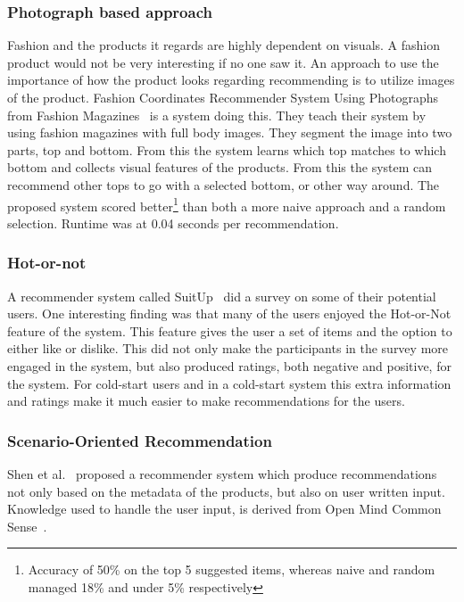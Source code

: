 \subsubsection{Photograph based approach}
    Fashion and the products it regards are highly dependent on visuals.  A fashion
    product would not be very interesting if no one saw it.  An approach to use the
    importance of how the product looks regarding recommending is to utilize images
    of the product.  Fashion Coordinates Recommender System Using Photographs from
    Fashion Magazines~\cite{Iwata:2011} is a system doing this.  They teach their
    system by using fashion magazines with full body images.  They segment the
    image into two parts, top and bottom.  From this the system learns which top
    matches to which bottom and collects visual features of the products.  From
    this the system can recommend other tops to go with a selected bottom, or other
    way around.  The proposed system scored better\footnote{Accuracy of 50\% on the
    top 5 suggested items, whereas naive and random managed 18\% and under 5\%
    respectively} than both a more naive approach and a random selection.  Runtime
    was at 0.04 seconds per recommendation.

\subsubsection{Hot-or-not}
    A recommender system called SuitUp~\cite{SuitUp} did a survey on some of their potential users.
    One interesting finding was that many of the users enjoyed the Hot-or-Not feature of the system.
    This feature gives the user a set of items and the option to either like or dislike.
    This did not only make the participants in the survey more engaged in the system, but also produced ratings, both negative and positive, for the system.
    For cold-start users and in a cold-start system this extra information and ratings make it much easier to make recommendations for the users.

\subsubsection{Scenario-Oriented Recommendation}
    Shen et al.~\cite{Shen:2007:AIG:1216295.1216368} proposed a recommender system which produce recommendations not only based on the metadata of the products, but also on user written input.
    Knowledge used to handle the user input, is derived from Open Mind Common Sense~\cite{Singh02openmind}.

